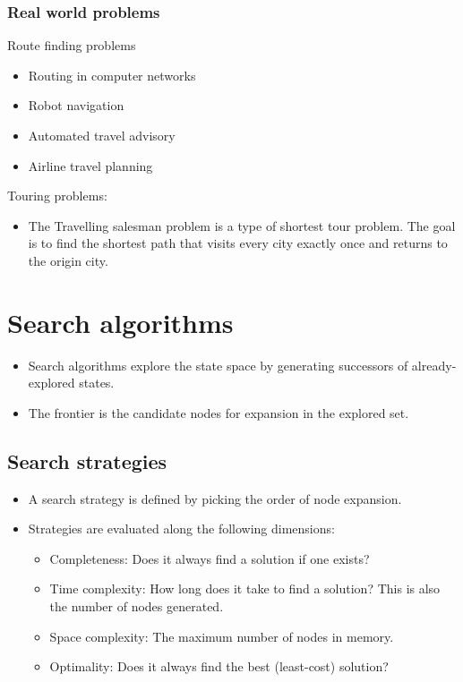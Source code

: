 \documentclass[11pt]{article}
\begin{document}
\subsubsection{Real world problems}
\label{sec:org13809b4}
Route finding problems
\begin{itemize}
\item Routing in computer networks
\item Robot navigation
\item Automated travel advisory
\item Airline travel planning
\end{itemize}

Touring problems:
\begin{itemize}
\item The Travelling salesman problem is a type of shortest tour problem. The goal is to find the shortest path that visits every city exactly once and returns to the origin city.
\end{itemize}

 \newpage
\section{Search algorithms}
\label{sec:org6692025}
\begin{itemize}
\item Search algorithms explore the state space by generating successors of already-explored states.
\item The frontier is the candidate nodes for expansion in the explored set.
\end{itemize}
\subsection{Search strategies}
\label{sec:orge54f1f0}
\begin{itemize}
\item A search strategy is defined by picking the order of node expansion.
\item Strategies are evaluated along the following dimensions:
\begin{itemize}
\item Completeness: Does it always find a solution if one exists?
\item Time complexity: How long does it take to find a solution? This is also the number of nodes generated.
\item Space complexity: The maximum number of nodes in memory.
\item Optimality: Does it always find the best (least-cost) solution?
\end{itemize}
\end{itemize}
\end{document}
